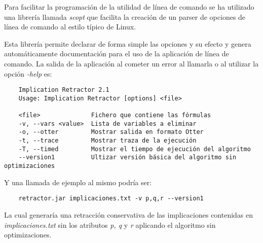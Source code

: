 	Para facilitar la programación de la utilidad de línea de comando se ha utilizado una librería llamada \textit{scopt}  que facilita la creación de un parser de opciones de línea de comando al estilo típico de Linux.
	
	Esta librería permite declarar de forma simple las opciones y su efecto y genera automáticamente documentación para el uso de la aplicación de línea de comando. La salida de la aplicación al cometer un error al llamarla o al utilizar la opción \textit{-help} es:


	\begin{verbatim}
	Implication Retractor 2.1
	Usage: Implication Retractor [options] <file>
	
	<file>              Fichero que contiene las fórmulas
	-v, --vars <value>  Lista de variables a eliminar
	-o, --otter         Mostrar salida en formato Otter
	-t, --trace         Mostrar traza de la ejecución
	-T, --timed         Mostrar el tiempo de ejecución del algoritmo
	--version1          Ultizar versión básica del algoritmo sin optimizaciones
	\end{verbatim}
	
	Y una llamada de ejemplo al mismo podría ser:
	
	\begin{verbatim}
	retractor.jar implicaciones.txt -v p,q,r --version1
	\end{verbatim}
	
	La cual generaría una retracción conservativa de las implicaciones contenidas en \textit{implicaciones.txt} sin los atributos \textit{p, q} y \textit{r} aplicando el algoritmo sin optimizaciones. 
	
	
		
		
	
	
	
	
	
	
	
	
	
	
	
	
	
	